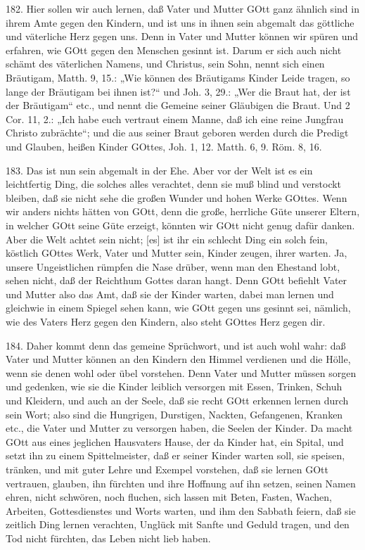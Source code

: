 182. Hier sollen wir auch lernen, daß Vater und Mutter GOtt ganz ähnlich sind in ihrem Amte gegen den Kindern, und ist uns in ihnen sein abgemalt das göttliche und väterliche Herz gegen uns. Denn in Vater und Mutter können wir spüren und erfahren, wie GOtt gegen den Menschen gesinnt ist. Darum er sich auch nicht schämt des väterlichen Namens, und Christus, sein Sohn, nennt sich einen Bräutigam, Matth. 9, 15.: „Wie können des Bräutigams Kinder Leide tragen, so lange der Bräutigam bei ihnen ist?“ und Joh. 3, 29.: „Wer die Braut hat, der ist der Bräutigam“ etc., und nennt die Gemeine seiner Gläubigen die Braut. Und 2 Cor. 11, 2.: „Ich habe euch vertraut einem Manne, daß ich eine reine Jungfrau Christo zubrächte“; und die aus seiner Braut geboren werden durch die Predigt und Glauben, heißen Kinder GOttes, Joh. 1, 12. Matth. 6, 9. Röm. 8, 16.

183. Das ist nun sein abgemalt in der Ehe. Aber vor der Welt ist es ein leichtfertig Ding, die solches alles verachtet, denn sie muß blind und verstockt bleiben, daß sie nicht sehe die großen Wunder und hohen Werke GOttes. Wenn wir anders nichts hätten von GOtt, denn die große, herrliche Güte unserer Eltern, in welcher GOtt seine Güte erzeigt, könnten wir GOtt nicht genug dafür danken. Aber die Welt achtet sein nicht; [es] ist ihr ein schlecht Ding ein solch fein, köstlich GOttes Werk, Vater und Mutter sein, Kinder zeugen, ihrer warten. Ja, unsere Ungeistlichen rümpfen die Nase drüber, wenn man den Ehestand lobt, sehen nicht, daß der Reichthum Gottes daran hangt. Denn GOtt befiehlt Vater und Mutter also das Amt, daß sie der Kinder warten, dabei man lernen und gleichwie in einem Spiegel sehen kann, wie GOtt gegen uns
gesinnt sei, nämlich, wie des Vaters Herz gegen den Kindern, also steht GOttes Herz gegen dir.

184. Daher kommt denn das gemeine Sprüchwort, und ist auch wohl wahr: daß Vater und Mutter können an den Kindern den Himmel verdienen und die Hölle, wenn sie denen wohl oder übel vorstehen. Denn Vater und Mutter müssen sorgen und gedenken, wie sie die Kinder leiblich versorgen mit Essen, Trinken, Schuh und Kleidern, und auch an der Seele, daß sie recht GOtt erkennen lernen durch sein Wort; also sind die Hungrigen, Durstigen, Nackten, Gefangenen, Kranken etc., die Vater und Mutter zu versorgen haben, die Seelen der Kinder. Da macht GOtt aus eines jeglichen Hausvaters Hause, der da Kinder hat, ein Spital, und setzt ihn zu einem Spittelmeister, daß er seiner Kinder warten soll, sie speisen, tränken, und mit guter Lehre und Exempel vorstehen, daß sie lernen GOtt vertrauen, glauben, ihn fürchten und ihre Hoffnung auf ihn setzen, seinen Namen ehren, nicht schwören, noch fluchen, sich lassen mit Beten, Fasten, Wachen, Arbeiten, Gottesdienstes und Worts warten, und ihm den Sabbath feiern, daß sie zeitlich Ding lernen verachten, Unglück mit Sanfte und Geduld tragen, und den Tod nicht fürchten, das Leben nicht lieb haben.

